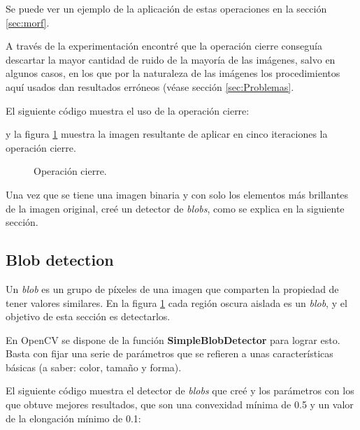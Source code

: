 \documentclass[a4paper,12pt]{article}
\begin{document}
Se puede ver un ejemplo de la aplicación de estas operaciones en la sección \ref{sec:morf}.

A través de la experimentación encontré que la operación cierre conseguía descartar la mayor cantidad de ruido de la mayoría de las imágenes, salvo en algunos casos, en los que por la naturaleza de las imágenes los procedimientos aquí usados dan resultados erróneos (véase sección \ref{sec:Problemas}.

El siguiente código muestra el uso de la operación cierre:

y la figura \ref{fig:img4} muestra la imagen resultante de aplicar en cinco iteraciones la operación cierre.
\begin{figure}[h!]
\centering
{}
\caption{Operación cierre.}
\label{fig:img4}
\end{figure}

Una vez que se tiene una imagen binaria y con solo los elementos más brillantes de la imagen original, creé un detector de \textit{blobs}, como se explica en la siguiente sección.

\subsection{Blob detection}

Un \textit{blob} es un grupo de píxeles de una imagen que comparten la propiedad de tener valores similares. En la figura \ref{fig:img4} cada región oscura aislada es un \textit{blob}, y el objetivo de esta sección es detectarlos.

En OpenCV se dispone de la función \textbf{SimpleBlobDetector} para lograr esto. Basta con fijar una serie de parámetros que se refieren a unas características básicas (a saber: color, tamaño y forma).

El siguiente código muestra el detector de \textit{blobs} que creé y los parámetros con los que obtuve mejores resultados, que son una convexidad mínima de 0.5 y un valor de la elongación mínimo de 0.1:
\end{document}
